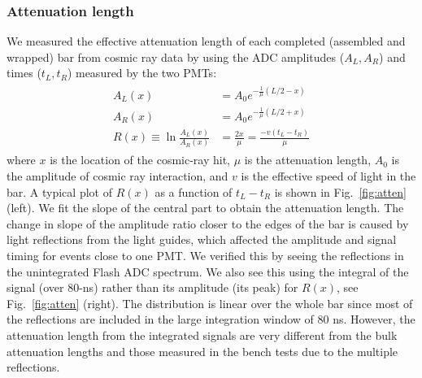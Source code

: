 \documentclass[3p,twocolumn]{elsarticle}
\begin{document}
\subsubsection{Attenuation length \label{attenlen}}
We measured the effective attenuation length of each completed
(assembled and wrapped) bar from cosmic ray data by using the ADC
amplitudes ($A_L,A_R$) and times ($t_L,t_R$) measured by the two PMTs:
\begin{eqnarray}
	\begin{split}
		A_L(x) &= A_0 e^{-\frac{1}{\mu}\left(L/2-x\right) }				\\
		A_R(x) &= A_0 e^{-\frac{1}{\mu}\left(L/2+x\right) }				\\
		R(x) \equiv \ln{\frac{A_L(x)}{A_R(x)}} &= \frac{2x}{\mu} = \frac{-v(t_{L}-t_{R})}{\mu}			
		 \label{eqn:atten}
	\end{split}
\end{eqnarray}
where $x$ is the location of the cosmic-ray hit, $\mu$ is the
attenuation length, $A_0$ is the amplitude of cosmic ray interaction,
and $v$ is the effective speed of light in the bar.  A typical plot of
$R(x)$ as a function of $t_{L}-t_{R}$ is shown in Fig.~\ref{fig:atten}
(left).  We fit the slope of the central part to obtain the
attenuation length.  The change in slope of the amplitude ratio closer
to the edges of the bar is caused by light reflections from the light
guides, which affected the amplitude and signal timing for events close to one
PMT. We verified this by seeing the reflections in the unintegrated
Flash ADC spectrum.  We also see this using the integral of the signal (over
80-ns) rather than
its amplitude (its peak) for $R(x)$, see Fig.~\ref{fig:atten} (right). The
distribution is linear over the whole bar since most of
the reflections are included in the large integration window of 80
\si{\nano\s}. However, the attenuation length from the integrated
signals are very different from the bulk attenuation lengths and those
measured in the bench tests due to the multiple reflections.
\end{document}
